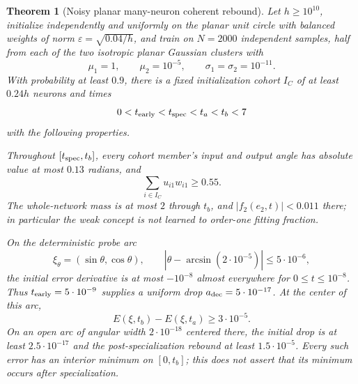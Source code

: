 \documentclass[11pt]{article}
\newtheorem{theorem}{Theorem}[section]
\theoremstyle{remark}
\begin{document}
\begin{theorem}[Noisy planar many-neuron coherent rebound]
\label{sbwide:theorem}
Let $h\ge10^{10}$, initialize independently and uniformly on the planar
unit circle with balanced weights of norm
$\varepsilon=\sqrt{0.04/h}$, and train on $N=2000$ independent samples,
half from each of the two isotropic planar Gaussian clusters with
\[
 \mu_1=1,\qquad \mu_2=10^{-5},\qquad
 \sigma_1=\sigma_2=10^{-11}.
\]
With probability at least $0.9$, there is a fixed initialization cohort
$I_C$ of at least $0.24h$ neurons and times
\[
 0<t_{\rm early}<t_{\rm spec}<t_a<t_b<7
\]
with the following properties.

Throughout $[t_{\rm spec},t_b]$, every cohort member's input and output
angle has absolute value at most $0.13$ radians, and
\[
 \sum_{i\in I_C}u_{i1}w_{i1}\ge0.55.
\]
The whole-network mass is at most $2$ through $t_b$, and
$|f_2(e_2,t)|<0.011$ there; in particular the weak concept is not learned
to order-one fitting fraction.

On the deterministic probe arc
\[
 \xi_\theta=(\sin\theta,\cos\theta),\qquad
 |\theta-\arcsin(2\cdot10^{-5})|\le5\cdot10^{-6},
\]
the initial error derivative is at most $-10^{-8}$ almost everywhere
for $0\le t\le10^{-8}$. Thus $t_{\rm early}=5\cdot10^{-9}$ supplies
a uniform drop $a_{\rm dec}=5\cdot10^{-17}$.
At the center of this arc,
\[
 E(\xi,t_b)-E(\xi,t_a)\ge3\cdot10^{-5}.
\]
On an open arc of angular width $2\cdot10^{-18}$ centered there,
the initial drop is at least $2.5\cdot10^{-17}$ and the
post-specialization rebound at least $1.5\cdot10^{-5}$.
Every such error has an interior minimum on $[0,t_b]$; this does not
assert that its minimum occurs after specialization.
\end{theorem}
\end{document}
